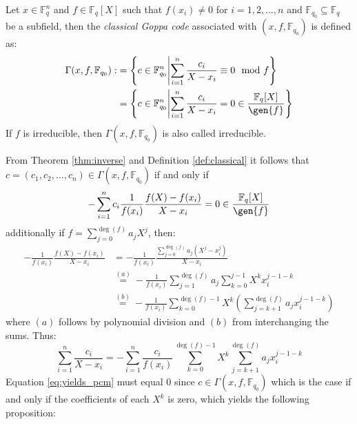 \begin{definition}\label{def:classical}
  Let $x \in \mathbb{F}_q^n$ and $f \in \mathbb{F}_q[X]$ such that $f(x_i) \neq 0$ for $i = 1, 2, \ldots, n$ and $\mathbb{F}_{q_0} \subseteq \mathbb{F}_q$ be a subfield, then the \textit{classical Goppa code} associated with $(x, f, \mathbb{F}_{q_0})$ is defined as:
  \begin{align*}
    \Gamma(x, f, \mathbb{F}_{q_0}) :&= \left\{c \in \mathbb{F}^n_{q_0} \middle| \sum^n_{i = 1} \frac{c_{i}}{X - x_{i}} \equiv 0 \mod f\right\}
     \\&= \left\{c \in \mathbb{F}^n_{q_0} \middle| \sum^n_{i = 1} \frac{c_{i}}{X - x_{i}} = 0 \in \frac{\mathbb{F}_q[X]}{\gen{f}}\right\}
  \end{align*}
  If $f$ is irreducible, then $\Gamma(x, f, \mathbb{F}_{q_0})$ is also called irreducible.
\end{definition}
From Theorem \ref{thm:inverse} and Definition \ref{def:classical} it follows that $c = (c_1, c_2, \ldots, c_{n}) \in \Gamma(x, f, \mathbb{F}_{q_0})$ if and only if
\begin{equation}\label{eq:condtion_on_coef}
  -\sum_{i = 1}^n c_i \frac{1}{f(x_i)} \frac{f(X) - f(x_i)}{X - x_i} = 0 \in \frac{\mathbb{F}_{q}[X]}{\gen{f}}
\end{equation}
additionally if $f = \sum_{j = 0}^{\deg(f)} a_j X^j$, then:
\begin{align*}
  -\frac{1}{f(x_i)}\frac{f(X) - f(x_i)}{X - x_{i}} &= -\frac{1}{f(x_{i})} \frac{\sum_{j=0}^{\deg(f)} a_{j}(X^j - x_i^j)}{X - x_i} \\ &\stackrel{(a)}= -\frac{1}{f(x_i)} \sum^{\deg(f)}_{j = 1} a_j \sum^{j - 1}_{k = 0} X^k x_i^{j - 1 - k}\\
  &\stackrel{(b)}= -\frac{1}{f(x_{i})} \sum^{\deg(f) - 1}_{k = 0} X^k \left(\sum^{\deg(f)}_{j = k + 1} a_j x_i^{j - 1 - k}\right)
\end{align*}
where $(a)$ follows by polynomial division and $(b)$ from interchanging the sums. Thus:
\begin{equation}\label{eq:yields_pcm}
  \sum_{i = 1}^n \frac{c_i}{X - x_i} = -\sum^n_{i = 1} \frac{c_{i}}{f(x_{i})} \sum_{k = 0}^{\deg(f) - 1} X^k \sum_{j = k + 1}^{\deg(f)} a_j x_i^{j - 1 - k}
\end{equation}
Equation \eqref{eq:yields_pcm} must equal $0$ since $c \in \Gamma(x, f, \mathbb{F}_{q_0})$ which is the case if and only if the coefficients of each $X^k$ is zero, which yields the following proposition:
